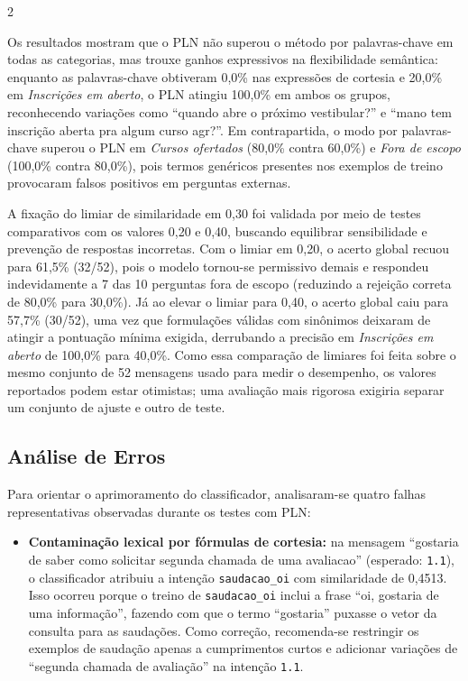 \documentclass[10pt]{article}
\begin{document}
\begin{multicols}{2}

Os resultados mostram que o PLN não superou o método por palavras-chave em todas as categorias, mas trouxe ganhos expressivos na flexibilidade semântica: enquanto as palavras-chave obtiveram 0,0\% nas expressões de cortesia e 20,0\% em \textit{Inscrições em aberto}, o PLN atingiu 100,0\% em ambos os grupos, reconhecendo variações como ``quando abre o próximo vestibular?'' e ``mano tem inscrição aberta pra algum curso agr?''. Em contrapartida, o modo por palavras-chave superou o PLN em \textit{Cursos ofertados} (80,0\% contra 60,0\%) e \textit{Fora de escopo} (100,0\% contra 80,0\%), pois termos genéricos presentes nos exemplos de treino provocaram falsos positivos em perguntas externas.

A fixação do limiar de similaridade em 0,30 foi validada por meio de testes comparativos com os valores 0,20 e 0,40, buscando equilibrar sensibilidade e prevenção de respostas incorretas. Com o limiar em 0,20, o acerto global recuou para 61,5\% (32/52), pois o modelo tornou-se permissivo demais e respondeu indevidamente a 7 das 10 perguntas fora de escopo (reduzindo a rejeição correta de 80,0\% para 30,0\%). Já ao elevar o limiar para 0,40, o acerto global caiu para 57,7\% (30/52), uma vez que formulações válidas com sinônimos deixaram de atingir a pontuação mínima exigida, derrubando a precisão em \textit{Inscrições em aberto} de 100,0\% para 40,0\%. Como essa comparação de limiares foi feita sobre o mesmo conjunto de 52 mensagens usado para medir o desempenho, os valores reportados podem estar otimistas; uma avaliação mais rigorosa exigiria separar um conjunto de ajuste e outro de teste.

\subsection{Análise de Erros}

Para orientar o aprimoramento do classificador, analisaram-se quatro falhas representativas observadas durante os testes com PLN:

\begin{itemize}
  \item \textbf{Contaminação lexical por fórmulas de cortesia:} na mensagem ``gostaria de saber como solicitar segunda chamada de uma avaliacao'' (esperado: \texttt{1.1}), o classificador atribuiu a intenção \texttt{saudacao\_oi} com similaridade de 0,4513. Isso ocorreu porque o treino de \texttt{saudacao\_oi} inclui a frase ``oi, gostaria de uma informação'', fazendo com que o termo ``gostaria'' puxasse o vetor da consulta para as saudações. Como correção, recomenda-se restringir os exemplos de saudação apenas a cumprimentos curtos e adicionar variações de ``segunda chamada de avaliação'' na intenção \texttt{1.1}.


\end{itemize}
\end{multicols}
\end{document}
